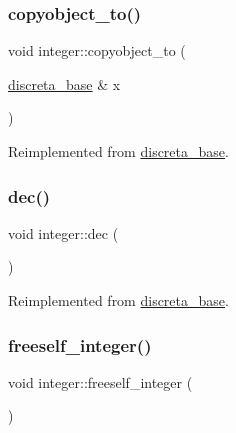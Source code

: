 \subsubsection{\texorpdfstring{copyobject\+\_\+to()}{copyobject\_to()}}
{\footnotesize\ttfamily void integer\+::copyobject\+\_\+to (\begin{DoxyParamCaption}\item[{\mbox{\hyperlink{classdiscreta__base}{discreta\+\_\+base}} \&}]{x }\end{DoxyParamCaption})\hspace{0.3cm}{\ttfamily [virtual]}}



Reimplemented from \mbox{\hyperlink{classdiscreta__base_a33180628d9ced231267229b3564790f3}{discreta\+\_\+base}}.

\mbox{\label{classinteger_a6b744350afb55f82d25e55bb6b1027b2}} 
\subsubsection{\texorpdfstring{dec()}{dec()}}
{\footnotesize\ttfamily void integer\+::dec (\begin{DoxyParamCaption}{ }\end{DoxyParamCaption})\hspace{0.3cm}{\ttfamily [virtual]}}



Reimplemented from \mbox{\hyperlink{classdiscreta__base_a11449a5cfa7dc5f5600e012517af6f0f}{discreta\+\_\+base}}.

\mbox{\label{classinteger_a02eb557612c9db1820dd75a77151edc0}} 
\subsubsection{\texorpdfstring{freeself\+\_\+integer()}{freeself\_integer()}}
{\footnotesize\ttfamily void integer\+::freeself\+\_\+integer (\begin{DoxyParamCaption}{ }\end{DoxyParamCaption})}

\mbox{\label{classinteger_ab975244fc25d0a9b3d4ef5104e3fcd24}} 
